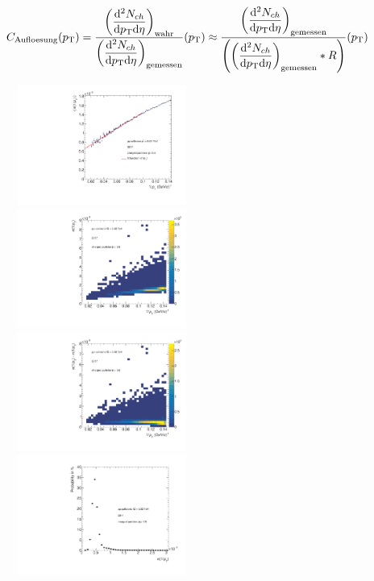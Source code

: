 \documentclass[12pt,a4paper]{report}
\begin{document}
\begin{equation} 
  \footnotesize C_{\mathrm{Aufloesung}}(p_{\mathrm{T}}) = \dfrac{\left(\dfrac{\mathrm{d}^2 N_{ch}}{\mathrm{d}p_{\mathrm{T}} \mathrm{d}\eta} \right)_{\mathrm{wahr}}}{\left(\dfrac{\mathrm{d}^2 N_{ch}}{\mathrm{d}p_{\mathrm{T}} \mathrm{d}\eta} \right)_{\mathrm{gemessen}}}(p_{\mathrm{T}})  \approx \dfrac{ \left(\dfrac{\mathrm{d}^2 N_{ch}}{\mathrm{d}p_{\mathrm{T}} \mathrm{d}\eta} \right)_{\mathrm{gemessen}} }{\left(\left(\dfrac{\mathrm{d}^2 N_{ch}}{\mathrm{d}p_{\mathrm{T}} \mathrm{d}\eta} \right)_{\mathrm{gemessen}} *R \right)}(p_{\mathrm{T}}) 
\end{equation}

\begin{figure}[tb!]
\centering
\includegraphics[width=0.495\textwidth]{Plots/fitfunc.pdf}  
\includegraphics[width=0.495\textwidth]{Plots/reso2dim.pdf}  
\includegraphics[width=0.495\textwidth]{Plots/scaledcov.pdf}  
\includegraphics[width=0.495\textwidth]{Plots/confunction.pdf}  

\end{figure}
\end{document}

